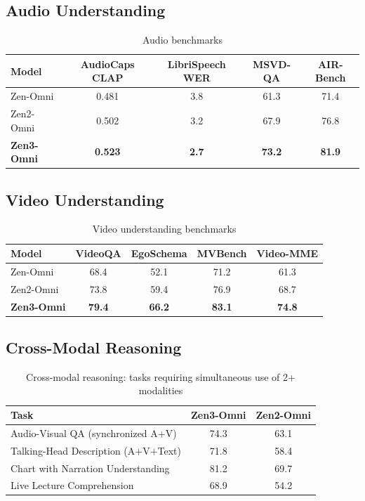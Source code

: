 \documentclass[11pt,a4paper]{article}
\begin{document}
\subsection{Audio Understanding}

\begin{table}[H]
\centering
\caption{Audio benchmarks}
\begin{tabular}{lcccc}
\toprule
\textbf{Model} & \textbf{AudioCaps CLAP} & \textbf{LibriSpeech WER} & \textbf{MSVD-QA} & \textbf{AIR-Bench} \\
\midrule
Zen-Omni     & 0.481 & 3.8 & 61.3 & 71.4 \\
Zen2-Omni    & 0.502 & 3.2 & 67.9 & 76.8 \\
\textbf{Zen3-Omni} & \textbf{0.523} & \textbf{2.7} & \textbf{73.2} & \textbf{81.9} \\
\bottomrule
\end{tabular}
\label{tab:audio}
\end{table}

\subsection{Video Understanding}

\begin{table}[H]
\centering
\caption{Video understanding benchmarks}
\begin{tabular}{lcccc}
\toprule
\textbf{Model} & \textbf{VideoQA} & \textbf{EgoSchema} & \textbf{MVBench} & \textbf{Video-MME} \\
\midrule
Zen-Omni     & 68.4 & 52.1 & 71.2 & 61.3 \\
Zen2-Omni    & 73.8 & 59.4 & 76.9 & 68.7 \\
\textbf{Zen3-Omni} & \textbf{79.4} & \textbf{66.2} & \textbf{83.1} & \textbf{74.8} \\
\bottomrule
\end{tabular}
\label{tab:video}
\end{table}

\subsection{Cross-Modal Reasoning}

\begin{table}[H]
\centering
\caption{Cross-modal reasoning: tasks requiring simultaneous use of 2+ modalities}
\begin{tabular}{lcc}
\toprule
\textbf{Task} & \textbf{Zen3-Omni} & \textbf{Zen2-Omni} \\
\midrule
Audio-Visual QA (synchronized A+V)   & 74.3 & 63.1 \\
Talking-Head Description (A+V+Text)  & 71.8 & 58.4 \\
Chart with Narration Understanding   & 81.2 & 69.7 \\
Live Lecture Comprehension           & 68.9 & 54.2 \\
\bottomrule
\end{tabular}
\label{tab:crossmodal}
\end{table}
\end{document}

